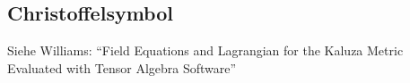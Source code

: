 \subsection{Christoffelsymbol}
Siehe Williams: "`Field Equations and Lagrangian for the Kaluza Metric
Evaluated with Tensor Algebra Software"'\cite{williams2015field}
